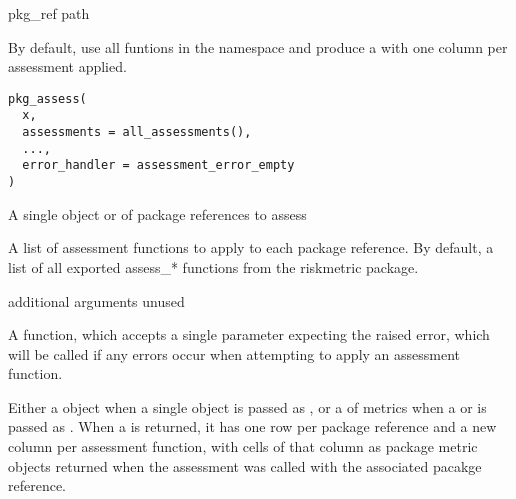 \documentclass[a4paper]{book}
\begin{document}
%
\begin{Arguments}
\begin{ldescription}
\item[\code{path}] pkg\_ref path
\end{ldescription}
\end{Arguments}
%
\begin{Description}
By default, use all  funtions in the 
namespace and produce a  with one column per
assessment applied.
\end{Description}
%
\begin{Usage}
\begin{verbatim}
pkg_assess(
  x,
  assessments = all_assessments(),
  ...,
  error_handler = assessment_error_empty
)
\end{verbatim}
\end{Usage}
%
\begin{Arguments}
\begin{ldescription}
\item[\code{x}] A single  object or
 of package references to assess

\item[\code{assessments}] A list of assessment functions to apply to each package
reference. By default, a list of all exported assess\_* functions from the
riskmetric package.

\item[\code{...}] additional arguments unused

\item[\code{error\_handler}] A function, which accepts a single parameter expecting
the raised error, which will be called if any errors occur when attempting
to apply an assessment function.
\end{ldescription}
\end{Arguments}
%
\begin{Value}
Either a  object when a single
 object is passed as , or a
 of metrics when a  or
 is passed as . When a 
is returned, it has one row per package reference and a new column per
assessment function, with cells of that column as package metric objects
returned when the assessment was called with the associated pacakge
reference.
\end{Value}
\end{document}
